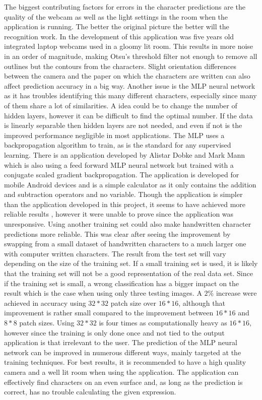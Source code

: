 \documentclass[12pt]{report}
\begin{document}
The biggest contributing factors for errors in the character predictions are the quality of the webcam as well as the light settings in the room when the application is running. The better the original picture the better will the recognition work. In the development of this application was five years old integrated laptop webcams used in a gloomy lit room. This results in more noise in an order of magnitude, making Otsu's threshold filter not enough to remove all outlines but the contours from the characters. Slight orientation differences between the camera and the paper on which the characters are written can also affect prediction accuracy in a big way. Another issue is the MLP neural network as it has troubles identifying this many different characters, especially since many of them share a lot of similarities. A idea could be to change the number of hidden layers, however it can be difficult to find the optimal number. If the data is linearly separable then hidden layers are not needed, and even if not is the improved performance negligible in most applications. 
\newline
\newline
The MLP uses a backpropagation algorithm to train, as is the standard for any supervised learning. There is an application developed by Alistar Dobke and Mark Mann which is also using a feed forward MLP neural network but trained with a conjugate scaled gradient backpropagation. The application is developed for mobile Android devices and is a simple calculator as it only contains the addition and subtraction operators and no variable. Though the application is simpler than the application developed in this project, it seems to have achieved more reliable results \cite{app}, however it were unable to prove since the application was unresponsive. Using another training set could also make handwritten character predictions more reliable. This was clear after seeing the improvement by swapping from a small dataset of handwritten characters to a much larger one with computer written characters. The result from the test set will vary depending on the size of the training set. If a small training set is used, it is likely that the training set will not be a good representation of the real data set. Since if the training set is small, a wrong classification has a bigger impact on the result which is the case when using only three testing images. A $2\%$ increase were achieved in accuracy using $32*32$ patch size over $16*16$, although that improvement is rather small compared to the improvement between $16*16$ and $8*8$ patch sizes. Using $32*32$ is four times as computationally heavy as $16*16$, however since the training is only done once and not tied to the output application is that irrelevant to the user. 
\newline
\newline
The prediction of the MLP neural network can be improved in numerous different ways, mainly targeted at the training techniques. For best results, it is recommended to have a high quality camera and a well lit room when using the application. The application can effectively find characters on an even surface and, as long as the prediction is correct, has no trouble calculating the given expression.
\end{document}
